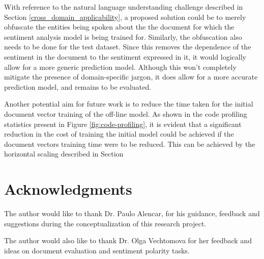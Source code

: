 \documentclass[conference]{IEEEtran}
\begin{document}
    With reference to the natural language understanding challenge described in Section \ref{cross_domain_applicability}, a proposed solution could be to merely obfuscate the entities being spoken about the the document for which the sentiment analysis model is being trained for. 
    Similarly, the obfuscation also needs to be done for the test dataset. 
    Since this removes the dependence of the sentiment in the document to the sentiment expressed in it, it would logically allow for a more generic prediction model. 
    Although this won't completely mitigate the presence of domain-specific jargon, it does allow for a more accurate prediction model, and remains to be evaluated.

    Another potential aim for future work is to reduce the time taken for the initial document vector training of the off-line model.
    As shown in the code profiling statistics present in Figure \ref{fig:code-profiling}, it is evident that a significant reduction in the cost of training the initial model could be achieved if the document vectors training time were to be reduced. 
    This can be achieved by the horizontal scaling described in Section 

\vspace{5mm}

\section{Acknowledgments}
    The author would like to thank Dr. Paulo Alencar, for his guidance, feedback and suggestions during the conceptualization of this research project. 

    The author would also like to thank Dr. Olga Vechtomova for her feedback and ideas on document evaluation and sentiment polarity tasks.

\vspace{5mm}



\balance
\end{document}

